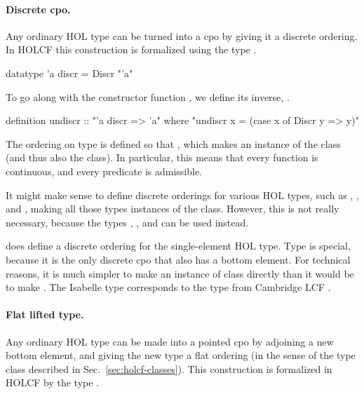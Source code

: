 \paragraph{Discrete cpo.} Any ordinary HOL type can be turned into a cpo by giving it a discrete ordering. In HOLCF this construction is formalized using the type .

\begin{isacode}
datatype 'a discr = Discr "'a"
\end{isacode}

\noindent
To go along with the constructor function , we define its inverse, .

\begin{isacode}
definition undiscr :: "'a discr => 'a"
  where "undiscr x = (case x of Discr y => y)"
\end{isacode}
 
The ordering on type  is defined so that , which makes  an instance of the  class (and thus also the  class). In particular, this means that every function  is continuous, and every predicate  is admissible.

It might make sense to define discrete orderings for various HOL types, such as , , and , making all those types instances of the  class. However, this is not really necessary, because the types , , and  can be used instead.

 does define a discrete ordering for the single-element HOL  type. Type  is special, because it is the only discrete cpo that also has a bottom element. For technical reasons, it is much simpler to make  an instance of class  directly than it would be to make . The Isabelle type  corresponds to the  type from Cambridge LCF \cite{paulson87lcf}.

\paragraph{Flat lifted type.} Any ordinary HOL type can be made into a pointed cpo by adjoining a new bottom element, and giving the new type a flat ordering (in the sense of the  type class described in Sec.~\ref{sec:holcf-classes}). This construction is formalized in HOLCF by the type .

